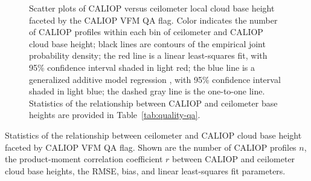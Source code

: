 \documentclass[amt,manuscript]{copernicus}\usepackage[]{graphicx}\usepackage[]{color}
\makeatletter
\newenvironment{kframe}{%
 \def\at@end@of@kframe{}%
 \ifinner\ifhmode%
  \def\at@end@of@kframe{\end{minipage}}%
  \begin{minipage}{\columnwidth}%
 \fi\fi%
 \def\FrameCommand##1{\hskip\@totalleftmargin \hskip-\fboxsep
 \colorbox{shadecolor}{##1}\hskip-\fboxsep
     \hskip-\linewidth \hskip-\@totalleftmargin \hskip\columnwidth}%
 \MakeFramed {\advance\hsize-\width
   \@totalleftmargin\z@ \linewidth\hsize
   \@setminipage}}%
 {\par\unskip\endMakeFramed%
 \at@end@of@kframe}
\makeatother
\begin{document}
\begin{figure}
  \centering
  \caption{Scatter plots of CALIOP versus ceilometer local cloud base height
    faceted by the CALIOP VFM QA flag.  Color indicates the number of CALIOP
    profiles within each bin of ceilometer and CALIOP cloud base height; black
    lines are contours of the empirical joint probability density; the red line
    is a linear least-squares fit, with 95\% confidence interval shaded in light
    red; the blue line is a generalized additive model regression
    \citep{Wood2004,Wood2011}, with 95\% confidence interval shaded in light
    blue; the dashed gray line is the one-to-one line.  Statistics of the
    relationship between CALIOP and ceilometer base heights are provided in
    Table~\ref{tab:quality-qa}.}
  \label{fig:quality-qa}
\end{figure}

\begin{table}
  \centering
  \caption{Statistics of the relationship between ceilometer and CALIOP cloud
    base height faceted by CALIOP VFM QA flag.  Shown are the number of CALIOP
    profiles $n$, the product-moment correlation coefficient $r$ between CALIOP
    and ceilometer cloud base heights, the RMSE, bias, and linear least-squares
    fit parameters.}
  \label{tab:quality-qa}
\begin{kframe}


{\ttfamily\noindent\bfseries\color{errorcolor}{\#\# Error in mutate\_impl(.data, dots): Evaluation error: object 'group1' not found.}}\end{kframe}
\end{table}
\end{document}
